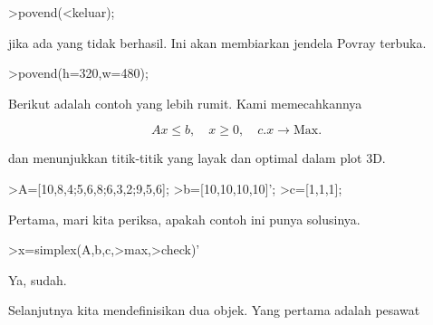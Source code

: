 \documentclass{article}
\begin{document}
\begin{eulernotebook}
\begin{eulercomment}
\begin{eulercomment}
\begin{eulercomment}
\begin{eulercomment}
\begin{eulercomment}
\begin{eulercomment}
\begin{eulercomment}
\begin{eulercomment}
\begin{eulercomment}
\begin{eulercomment}
\begin{eulercomment}
\begin{eulercomment}
\begin{eulercomment}
\begin{eulercomment}
\begin{eulercomment}
\begin{eulercomment}
\begin{eulercomment}
\begin{eulercomment}
\begin{eulercomment}
\begin{eulercomment}
\begin{eulercomment}
\end{eulercomment}
\begin{eulerttcomment}
 >povend(<keluar);
\end{eulerttcomment}
\begin{eulercomment}

jika ada yang tidak berhasil. Ini akan membiarkan jendela Povray
terbuka.
\end{eulercomment}
\begin{eulerprompt}
>povend(h=320,w=480);
\end{eulerprompt}
\begin{eulercomment}
Berikut adalah contoh yang lebih rumit. Kami memecahkannya

\end{eulercomment}
\begin{eulerformula}
\[
Ax \le b, \quad x \ge 0, \quad c.x \to \text{Max.}
\]
\end{eulerformula}
\begin{eulercomment}
dan menunjukkan titik-titik yang layak dan optimal dalam plot 3D.
\end{eulercomment}
\begin{eulerprompt}
>A=[10,8,4;5,6,8;6,3,2;9,5,6];
>b=[10,10,10,10]';
>c=[1,1,1];
\end{eulerprompt}
\begin{eulercomment}
Pertama, mari kita periksa, apakah contoh ini punya solusinya.
\end{eulercomment}
\begin{eulerprompt}
>x=simplex(A,b,c,>max,>check)'
\end{eulerprompt}
\begin{euleroutput}
  [0,  1,  0.5]
\end{euleroutput}
\begin{eulercomment}
Ya, sudah.

Selanjutnya kita mendefinisikan dua objek. Yang pertama adalah pesawat


\end{eulercomment}
\end{eulercomment}
\end{eulercomment}
\end{eulercomment}
\end{eulercomment}
\end{eulercomment}
\end{eulercomment}
\end{eulercomment}
\end{eulercomment}
\end{eulercomment}
\end{eulercomment}
\end{eulercomment}
\end{eulercomment}
\end{eulercomment}
\end{eulercomment}
\end{eulercomment}
\end{eulercomment}
\end{eulercomment}
\end{eulercomment}
\end{eulercomment}
\end{eulercomment}
\end{eulernotebook}
\end{document}
